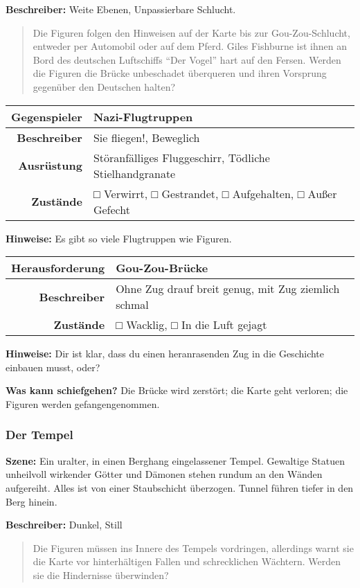 \documentclass[]{article}
\begin{document}
\textbf{Beschreiber:} Weite Ebenen, Unpassierbare Schlucht.

\begin{quote}
Die Figuren folgen den Hinweisen auf der Karte bis zur Gou-Zou-Schlucht,
entweder per Automobil oder auf dem Pferd. Giles Fishburne ist ihnen an
Bord des deutschen Luftschiffs ``Der Vogel'' hart auf den Fersen. Werden
die Figuren die Brücke unbeschadet überqueren und ihren Vorsprung
gegenüber den Deutschen halten?
\end{quote}

\begin{longtable}[]{@{}rl@{}}
\toprule
Gegenspieler & Nazi-Flugtruppen\tabularnewline
\midrule
\endhead
\textbf{Beschreiber} & Sie fliegen!, Beweglich\tabularnewline
\textbf{Ausrüstung} & Störanfälliges Fluggeschirr, Tödliche
Stielhandgranate\tabularnewline
\textbf{Zustände} & □ Verwirrt, □ Gestrandet, □ Aufgehalten, □ Außer
Gefecht\tabularnewline
\bottomrule
\end{longtable}

\textbf{Hinweise:} Es gibt so viele Flugtruppen wie Figuren.

\begin{longtable}[]{@{}rl@{}}
\toprule
Herausforderung & Gou-Zou-Brücke\tabularnewline
\midrule
\endhead
\textbf{Beschreiber} & Ohne Zug drauf breit genug, mit Zug ziemlich
schmal\tabularnewline
\textbf{Zustände} & □ Wacklig, □ In die Luft gejagt\tabularnewline
\bottomrule
\end{longtable}

\textbf{Hinweise:} Dir ist klar, dass du einen heranrasenden Zug in die
Geschichte einbauen musst, oder?

\textbf{Was kann schiefgehen?} Die Brücke wird zerstört; die Karte geht
verloren; die Figuren werden gefangengenommen.

\subsubsection{Der Tempel}\label{der-tempel}

\textbf{Szene:} Ein uralter, in einen Berghang eingelassener Tempel.
Gewaltige Statuen unheilvoll wirkender Götter und Dämonen stehen rundum
an den Wänden aufgereiht. Alles ist von einer Staubschicht überzogen.
Tunnel führen tiefer in den Berg hinein.

\textbf{Beschreiber:} Dunkel, Still

\begin{quote}
Die Figuren müssen ins Innere des Tempels vordringen, allerdings warnt
sie die Karte vor hinterhältigen Fallen und schrecklichen Wächtern.
Werden sie die Hindernisse überwinden?
\end{quote}
\end{document}
